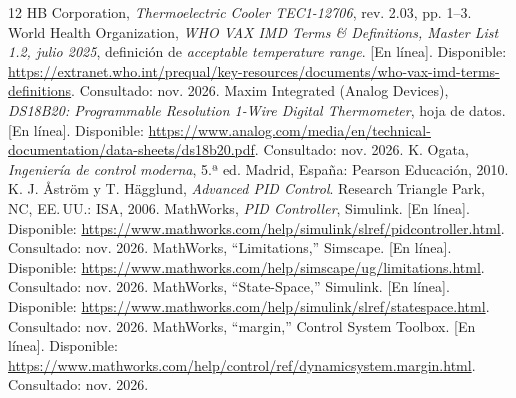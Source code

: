 \documentclass[journal,twocolumn]{IEEEtran}
\begin{document}
\begin{thebibliography}{12}
 HB Corporation, \emph{Thermoelectric Cooler TEC1-12706}, rev. 2.03, pp. 1--3.
 World Health Organization, \emph{WHO VAX IMD Terms \& Definitions, Master List 1.2, julio 2025}, definición de \emph{acceptable temperature range}. [En línea]. Disponible: \url{https://extranet.who.int/prequal/key-resources/documents/who-vax-imd-terms-definitions}. Consultado: nov. 2026.
 Maxim Integrated (Analog Devices), \emph{DS18B20: Programmable Resolution 1-Wire Digital Thermometer}, hoja de datos. [En línea]. Disponible: \url{https://www.analog.com/media/en/technical-documentation/data-sheets/ds18b20.pdf}. Consultado: nov. 2026.
 K. Ogata, \emph{Ingeniería de control moderna}, 5.ª ed. Madrid, España: Pearson Educación, 2010.
 K. J. Åström y T. Hägglund, \emph{Advanced PID Control}. Research Triangle Park, NC, EE.\,UU.: ISA, 2006.
 MathWorks, \emph{PID Controller}, Simulink. [En línea]. Disponible: \url{https://www.mathworks.com/help/simulink/slref/pidcontroller.html}. Consultado: nov. 2026.
 MathWorks, ``Limitations,'' Simscape. [En línea]. Disponible: \url{https://www.mathworks.com/help/simscape/ug/limitations.html}. Consultado: nov. 2026.
 MathWorks, ``State-Space,'' Simulink. [En línea]. Disponible: \url{https://www.mathworks.com/help/simulink/slref/statespace.html}. Consultado: nov. 2026.
 MathWorks, ``margin,'' Control System Toolbox. [En línea]. Disponible: \url{https://www.mathworks.com/help/control/ref/dynamicsystem.margin.html}. Consultado: nov. 2026.
\end{thebibliography}
\end{document}
